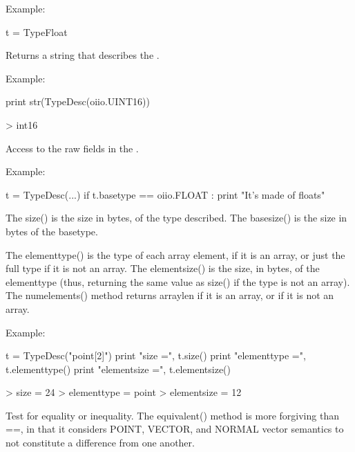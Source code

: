 \noindent Example:
\begin{code}
    t = TypeFloat
\end{code}
\apiend

Returns a string that describes the \TypeDesc.

\noindent Example:
\begin{code}
    print str(TypeDesc(oiio.UINT16))

    > int16
\end{code}
\apiend

Access to the raw fields in the \TypeDesc.

\noindent Example:
\begin{code}
    t = TypeDesc(...)
    if t.basetype == oiio.FLOAT :
        print "It's made of floats"
\end{code}
\apiend

The {\cf size()} is the size in bytes, of the type described.  The
{\cf basesize()} is the size in bytes of the {\cf basetype}.

The {\cf elementtype()} is the type of each array element, if it is an
array, or just the full type if it is not an array.  The {\cf elementsize()}
is the size, in bytes, of the {\cf elementtype} (thus, returning the same
value as {\cf size()} if the type is not an array).  The {\cf numelements()}
method returns {\cf arraylen} if it is an array, or {} if it is not
an array.

\noindent Example:
\begin{code}
    t = TypeDesc("point[2]")
    print "size =", t.size()
    print "elementtype =", t.elementtype()
    print "elementsize =", t.elementsize()

    > size = 24
    > elementtype = point
    > elementsize = 12
\end{code}
\apiend

Test for equality or inequality.  The {\cf equivalent()} method is more
forgiving than {\cf ==}, in that it considers {\cf POINT}, {\cf VECTOR},
and {\cf NORMAL} vector semantics to not constitute a difference from one
another.

